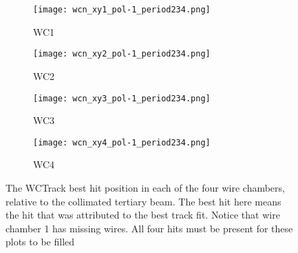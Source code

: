        \begin{figure}[h]	   
            \centering
   
            \begin{subfigure}[b]{0.23\textwidth}
            \centering
            \texttt{[image: wcn\_xy1\_pol-1\_period234.png]}
            \caption{WC1}
            \label{fig_wc1}
            \end{subfigure}
            \hfill             
             \begin{subfigure}[b]{0.23\textwidth}
            \centering
            \texttt{[image: wcn\_xy2\_pol-1\_period234.png]}
            \caption{WC2}
            \label{fig_wc2}
            \end{subfigure}
            \hfill 
              \begin{subfigure}[b]{0.23\textwidth}
            \centering
            \texttt{[image: wcn\_xy3\_pol-1\_period234.png]}
            \caption{WC3}
            \label{fig_wc3}
            \end{subfigure}
            \hfill    
             \begin{subfigure}[b]{0.23\textwidth}
            \centering
            \texttt{[image: wcn\_xy4\_pol-1\_period234.png]}
            \caption{WC4}
            \label{fig_wc4}
            \end{subfigure}
            \hfill
   \caption[short]{The WCTrack best hit position in each of the four wire chambers, relative to the collimated tertiary beam. The best hit here means the hit that was attributed to the best track fit. Notice that wire chamber 1 has missing wires. All four hits must be present for these plots to be filled}
   \label{fig_xyhits}
  \end{figure}
  
